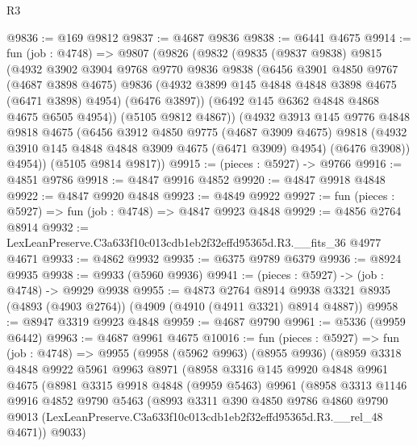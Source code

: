 \begin{lexlean}{R3}
\begin{coremodule}
@9836 := @169 @9812
@9837 := @4687 @9836
@9838 := @6441 @4675
@9914 := fun (job : @4748) =>
  @9807
    (@9826
      (@9832
        (@9835
          (@9837 @9838)
          @9815
          (@4932
            @3902
            @3904
            @9768
            @9770
            @9836
            @9838
            (@6456
              @3901
              @4850
              @9767
              (@4687 @3898 @4675)
              @9836
              (@4932 @3899 @145 @4848 @4848 @3898 @4675 (@6471 @3898) @4954)
              (@6476 @3897))
            (@6492 @145 @6362 @4848 @4868 @4675 @6505 @4954))
          (@5105 @9812 @4867))
        (@4932
          @3913
          @145
          @9776
          @4848
          @9818
          @4675
          (@6456
            @3912
            @4850
            @9775
            (@4687 @3909 @4675)
            @9818
            (@4932 @3910 @145 @4848 @4848 @3909 @4675 (@6471 @3909) @4954)
            (@6476 @3908))
          @4954))
      (@5105 @9814 @9817))
@9915 := (pieces : @5927) -> @9766
@9916 := @4851 @9786
@9918 := @4847 @9916 @4852
@9920 := @4847 @9918 @4848
@9922 := @4847 @9920 @4848
@9923 := @4849 @9922
@9927 := fun (pieces : @5927) => fun (job : @4748) => @4847 @9923 @4848
@9929 := @4856 @2764 @8914
@9932 := LexLeanPreserve.C3a633f10c013cdb1eb2f32effd95365d.R3.__fits_36 @4977 @4671
@9933 := @4862 @9932
@9935 := @6375 @9789 @6379
@9936 := @8924 @9935
@9938 := @9933 (@5960 @9936)
@9941 := (pieces : @5927) -> (job : @4748) -> @9929 @9938
@9955 := @4873
    @2764
    @8914
    @9938
    @3321
    @8935
    (@4893 (@4903 @2764))
    (@4909 (@4910 (@4911 @3321) @8914 @4887))
@9958 := @8947 @3319 @9923 @4848
@9959 := @4687 @9790
@9961 := @5336 (@9959 @6442)
@9963 := @4687 @9961 @4675
@10016 := fun (pieces : @5927) =>
  fun (job : @4748) =>
  @9955
    (@9958
      (@5962 @9963)
      (@8955 @9936)
      (@8959
        @3318
        @4848
        @9922
        @5961
        @9963
        @8971
        (@8958
          @3316
          @145
          @9920
          @4848
          @9961
          @4675
          (@8981
            @3315
            @9918
            @4848
            (@9959 @5463)
            @9961
            (@8958
              @3313
              @1146
              @9916
              @4852
              @9790
              @5463
              (@8993
                @3311
                @390
                @4850
                @9786
                @4860
                @9790
                @9013
                (LexLeanPreserve.C3a633f10c013cdb1eb2f32effd95365d.R3.__rel_48 @4671))
              @9033)

\end{coremodule}
\end{lexlean}
